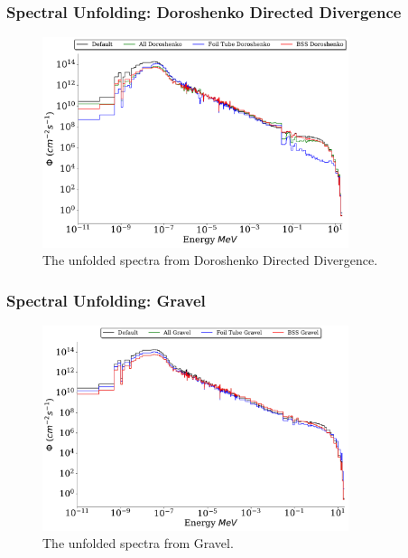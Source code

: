 \documentclass[fleqn]{beamer}
\begin{document}
\begin{frame}
\frametitle{Spectral Unfolding: Doroshenko Directed Divergence}

\begin{figure}
\centering
\includegraphics[width = 0.8\textwidth]{unfolded_do}
\caption{The unfolded spectra from Doroshenko Directed Divergence.}
\end{figure}

\end{frame}

\begin{frame}
\frametitle{Spectral Unfolding: Gravel}

\begin{figure}
\centering
\includegraphics[width = 0.8\textwidth]{unfolded_gr}
\caption{The unfolded spectra from Gravel.}
\end{figure}

\end{frame}
\end{document}
